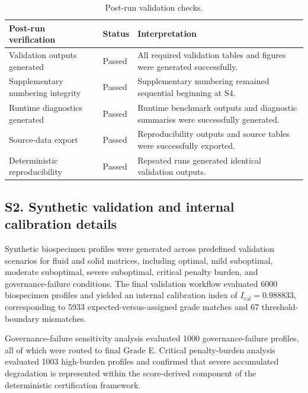 \documentclass[preprint,12pt]{elsarticle}
\begin{document}
\begin{table}[!htbp]
\caption{Post-run validation checks.}
\label{tab:post_run_checks}
\centering
\footnotesize
\setlength{\tabcolsep}{4pt}
\renewcommand{\arraystretch}{1.10}

\begin{tabular}{@{}L{4.7cm}C{1.8cm}L{7.3cm}@{}}
\toprule
\textbf{Post-run verification}
& \textbf{Status}
& \textbf{Interpretation} \\
\midrule

Validation outputs generated
& Passed
& All required validation tables and figures were generated successfully. \\

Supplementary numbering integrity
& Passed
& Supplementary numbering remained sequential beginning at S4. \\

Runtime diagnostics generated
& Passed
& Runtime benchmark outputs and diagnostic summaries were successfully generated. \\

Source-data export
& Passed
& Reproducibility outputs and source tables were successfully exported. \\

Deterministic reproducibility
& Passed
& Repeated runs generated identical validation outputs. \\

\bottomrule
\end{tabular}
\end{table}

\FloatBarrier

\subsection*{S2. Synthetic validation and internal calibration details}

Synthetic biospecimen profiles were generated across predefined validation scenarios for fluid and solid matrices, including optimal, mild suboptimal, moderate suboptimal, severe suboptimal, critical penalty burden, and governance-failure conditions. The final validation workflow evaluated 6000 biospecimen profiles and yielded an internal calibration index of \(I_{\mathrm{cal}}=0.988833\), corresponding to 5933 expected-versus-assigned grade matches and 67 threshold-boundary mismatches.

Governance-failure sensitivity analysis evaluated 1000 governance-failure profiles, all of which were routed to final Grade E. Critical penalty-burden analysis evaluated 1003 high-burden profiles and confirmed that severe accumulated degradation is represented within the score-derived component of the deterministic certification framework.
\end{document}
